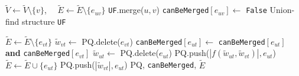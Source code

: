 \begin{algorithm}
\begin{algorithmic}[1]
          \State $\tilde{V} \gets \tilde{V} \setminus \{ v\}$, $\quad \tilde{E} \gets \tilde{E} \setminus \{ e_{uv}\}$ 
          \State \texttt{UF}.merge($u,v$) 
          \State \texttt{canBeMerged}$[e_{uv}] \gets$ \texttt{False} 
        \EndIf
      \EndWhile
      \State
      \Return Union-find structure \texttt{UF}
  \end{algorithmic}
  \hspace*{1.5cm} 
    \begin{algorithmic}[1]
       
        \State $\tilde{E} \gets \tilde{E} \setminus \{e_{vt}\}$
        \State $\tilde{w}_{vt} \gets$ PQ.delete($e_{vt}$) 
        \State \texttt{canBeMerged}$[e_{ut}] \gets$ \texttt{canBeMerged}$[e_{ut}]$ \textbf{and} \texttt{canBeMerged}$[e_{vt}]$
          \State $\tilde{w}_{ut} \gets$ PQ.delete($e_{ut}$)  
          \State PQ.push($ |f(\tilde{w}_{ut}, \tilde{w}_{vt})|, e_{ut}$) 
        \Else
          \State $\tilde{E} \gets \tilde{E} \cup \{e_{ut}\}$
          \State PQ.push($ |\tilde{w}_{vt}|, e_{ut}$) 
        \EndIf
      \EndFor
      \State
      \Return PQ, \texttt{canBeMerged}, $\tilde{E}$
    \EndFunction
  \end{algorithmic}
  \label{detailed_alg}
\end{algorithm}
